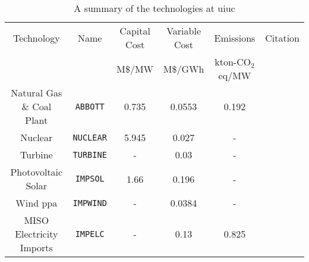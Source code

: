 \begin{table*}[ht]
  \centering
  \caption{A summary of the technologies at \gls{uiuc}}
  \label{tab:model}
  \begin{tabular}{|cccccc|}
    \hline
    Technology & Name & Capital Cost & Variable Cost & Emissions& Citation\\
    & & M\$/MW & M\$/GWh & kton-CO$_2$eq/MW&\\
    \hline
    Natural Gas \& Coal Plant & \texttt{ABBOTT} & 0.735 & 0.0553 & 0.192&\cite{isee_illinois_2015,affiliated_engineers_inc_utilities_2015,us_department_of_energy_capital_2016,uiuc_fs_edna_nodate,energy_information_administration_electricity_nodate}\\
    Nuclear & \texttt{NUCLEAR} & 5.945 & 0.027 & - &\cite{us_department_of_energy_capital_2016,desai_nuclear_2018,wna_nuclear_2017,noauthor_eti_2018}\\
    Turbine & \texttt{TURBINE} & - & 0.03  & - &\cite{uiuc_fs_edna_nodate,affiliated_engineers_inc_utilities_2015}\\
    Photovoltaic Solar & \texttt{IMPSOL} & 1.66 & 0.196 & - &\cite{noauthor_solar_nodate,uiuc_fs_edna_nodate}\\
    Wind \gls{ppa} & \texttt{IMPWIND} & - & 0.0384 & - & \cite{breitweiser_wind_2016,uiuc_fs_edna_nodate}\\
    MISO Electricity Imports & \texttt{IMPELC} & - & 0.13 & 0.825&\cite{isee_illinois_2015,uiuc_fs_edna_nodate,noauthor_abbott_nodate}\\
    \hline
  \end{tabular}
\end{table*}

